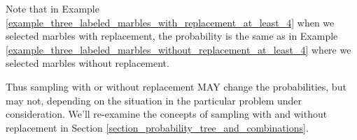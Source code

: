 Note that in Example \ref{example_three_labeled_marbles_with_replacement_at_least_4} when we selected marbles with replacement, the probability is the same as in Example \ref{example_three_labeled_marbles_without_replacement_at_least_4} where we selected marbles without replacement.

Thus sampling with or without replacement MAY change the probabilities, but may not, depending on the situation in the particular problem under consideration.  We'll re-examine the concepts of sampling with and without replacement in Section \ref{section_probability_tree_and_combinations}.

